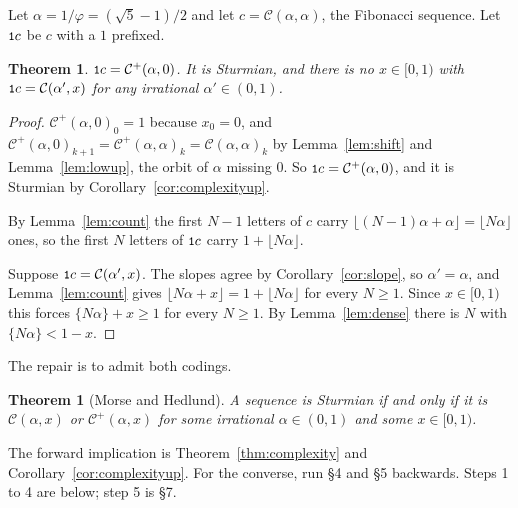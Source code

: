 \documentclass[11pt,a4paper]{article}
\newcommand{\seq}[1]{\texttt{\small #1}}
\newcommand{\C}{\mathcal{C}}
\newcommand{\Cp}{\mathcal{C}^{+}}
\theoremstyle{definition}
\theoremstyle{plain}
\newtheorem{theorem}[definition]{Theorem}
\begin{document}
Let $\alpha = 1/\varphi = (\sqrt 5 - 1)/2$ and let $c = \C(\alpha,\alpha)$, the
Fibonacci sequence. Let $\seq{1}c$ be $c$ with a $1$ prefixed.

\begin{theorem}\label{thm:counterex}
$\seq{1}c = \Cp(\alpha,0)$. It is Sturmian, and there is no $x \in [0,1)$ with
$\seq{1}c = \C(\alpha', x)$ for any irrational $\alpha' \in (0,1)$.
\end{theorem}

\begin{proof}
$\Cp(\alpha,0)_0 = 1$ because $x_0 = 0$, and
$\Cp(\alpha,0)_{k+1} = \Cp(\alpha,\alpha)_k = \C(\alpha,\alpha)_k$ by
Lemma~\ref{lem:shift} and Lemma~\ref{lem:lowup}, the orbit of $\alpha$ missing
$0$. So $\seq{1}c = \Cp(\alpha,0)$, and it is Sturmian by
Corollary~\ref{cor:complexityup}.

By Lemma~\ref{lem:count} the first $N-1$ letters of $c$ carry
$\lfloor (N-1)\alpha + \alpha\rfloor = \lfloor N\alpha\rfloor$ ones, so the first
$N$ letters of $\seq{1}c$ carry $1 + \lfloor N\alpha\rfloor$.

Suppose $\seq{1}c = \C(\alpha',x)$. The slopes agree by
Corollary~\ref{cor:slope}, so $\alpha' = \alpha$, and Lemma~\ref{lem:count}
gives $\lfloor N\alpha + x\rfloor = 1 + \lfloor N\alpha \rfloor$ for every
$N \geq 1$. Since $x \in [0,1)$ this forces $\{N\alpha\} + x \geq 1$ for every
$N \geq 1$. By Lemma~\ref{lem:dense} there is $N$ with $\{N\alpha\} < 1-x$.
\end{proof}

The repair is to admit both codings.

\begin{theorem}[Morse and Hedlund]\label{thm:mh}
A sequence is Sturmian if and only if it is $\C(\alpha,x)$ or $\Cp(\alpha,x)$
for some irrational $\alpha \in (0,1)$ and some $x \in [0,1)$.
\end{theorem}

The forward implication is Theorem~\ref{thm:complexity} and
Corollary~\ref{cor:complexityup}. For the converse, run \S4 and \S5 backwards.
Steps 1 to 4 are below; step 5 is \S7.
\end{document}
